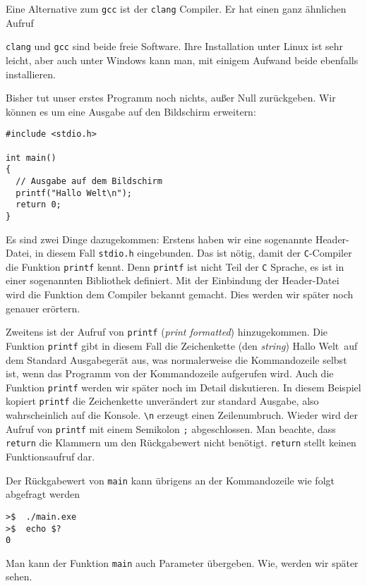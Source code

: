 Eine Alternative zum \texttt{gcc} ist der \texttt{clang} Compiler.
Er hat einen ganz ähnlichen Aufruf

\vspace*{0.5cm}
\vspace*{0.5cm}

\noindent\texttt{clang} und \texttt{gcc} sind beide freie Software.
Ihre Installation unter Linux ist sehr leicht, aber auch unter Windows kann man, mit einigem Aufwand beide ebenfalls installieren.

Bisher tut unser erstes Programm noch nichts, außer Null zurückgeben. 
Wir können es um eine Ausgabe auf den Bildschirm erweitern:
\begin{lstlisting}[caption={Programm Hallo Welt}, belowcaptionskip=0.3em]
#include <stdio.h>

int main()
{
  // Ausgabe auf dem Bildschirm
  printf("Hallo Welt\n");
  return 0;
}
\end{lstlisting}
Es sind zwei Dinge dazugekommen:
Erstens haben wir eine sogenannte Header-Datei, in diesem Fall \texttt{stdio.h} eingebunden.
Das ist nötig, damit der \texttt{C}-Compiler die Funktion \texttt{printf} kennt.
Denn \texttt{printf} ist nicht Teil der \texttt{C} Sprache, es ist in einer sogenannten Bibliothek definiert. 
Mit der Einbindung der Header-Datei wird die Funktion dem Compiler bekannt gemacht.
Dies werden wir später noch genauer erörtern.

Zweitens ist der Aufruf von \texttt{printf} (\emph{print formatted}) hinzugekommen.
Die Funktion \texttt{printf} gibt in diesem Fall die Zeichenkette (den \emph{string}) \glqq Hallo Welt\grqq\ auf dem Standard Ausgabegerät aus, was normalerweise die Kommandozeile selbst ist, wenn das Programm von der Kommandozeile aufgerufen wird. 
Auch die Funktion \texttt{printf} werden wir später noch im Detail diskutieren.
In diesem Beispiel kopiert \texttt{printf} die Zeichenkette unverändert zur standard Ausgabe, also wahrscheinlich auf die Konsole.
\verb|\n| erzeugt einen Zeilenumbruch.
Wieder wird der Aufruf von \texttt{printf} mit einem Semikolon \texttt{;} abgeschlossen.
Man beachte, dass \texttt{return} die Klammern um den Rückgabewert nicht benötigt.
\texttt{return} stellt keinen Funktionsaufruf dar.


Der Rückgabewert von \texttt{main} kann übrigens an der Kommandozeile wie folgt abgefragt werden

\vspace*{0.5cm}
\begin{verbatim}
>$  ./main.exe
>$  echo $?
0
\end{verbatim}
\vspace*{0.5cm}

\noindent Man kann der Funktion \texttt{main} auch Parameter übergeben.
Wie, werden wir später sehen.
